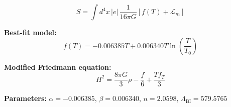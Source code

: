 
\begin{equation}
  S = \int d^4x \, |e| \, \frac{1}{16\pi G} \left[ f(T) + \mathcal{L}_m \right]
\end{equation}

\textbf{Best-fit model:}
\begin{equation}
  f(T) = -0.006385 T + 0.006340 T \ln\!\left(\frac{T}{T_0}\right)
\end{equation}

\textbf{Modified Friedmann equation:}
\begin{equation}
  H^2 = \frac{8\pi G}{3} \rho - \frac{f}{6} + \frac{T f_T}{3}
\end{equation}

\textbf{Parameters:}
$\alpha = -0.006385$, \quad
$\beta = 0.006340$, \quad
$n = 2.0598$, \quad
$\Lambda_{\text{BI}} = 579.5765$